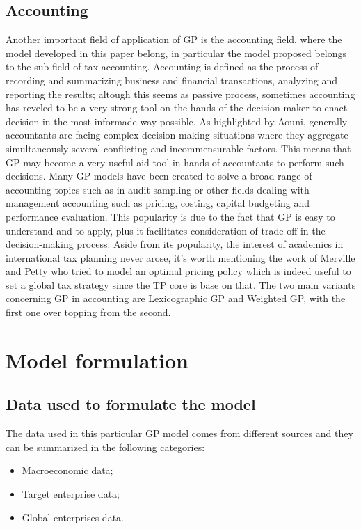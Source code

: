 \documentclass{article}
\begin{document}
\subsection{Accounting}
Another important field of application of GP is the accounting field, where the model developed in this paper belong, in particular the model proposed belongs to the sub field of tax accounting. Accounting is defined as the process of recording and summarizing business and financial transactions, analyzing and reporting the results; altough this seems as passive process, sometimes accounting has reveled to be a very strong tool on the hands of the decision maker to enact decision in the most informade way possible.
As highlighted by Aouni\cite{aouni_goal_2017}, generally accountants are facing complex decision-making situations where they aggregate simultaneously several conflicting and incommensurable factors. This means that GP may become a very useful aid tool in hands of accountants to perform such decisions. Many GP models have been created to solve a broad range of accounting topics such as in audit sampling\cite{tayi_integration_1985} or other fields dealing with management accounting such as pricing\cite{tan_multipleobjective_2008}, costing\cite{dowlatshahi_product_2001}, capital budgeting and performance evaluation\cite{hung_integrated_2011}.
This popularity is due to the fact that GP is easy to understand and to apply, plus it facilitates consideration of trade-off in the decision-making process.
Aside from its popularity, the interest of academics in international tax planning never arose,
it’s worth mentioning the work of Merville and Petty\cite{merville_transfer_1978} who tried to model an optimal pricing policy which is indeed useful to set a global tax
strategy since the TP core is base on that.
The two main variants concerning GP in accounting are Lexicographic GP and Weighted GP, with the first one over topping from the second.

\pagebreak

\section{Model formulation}

\subsection{Data used to formulate the model}
The data used in this particular GP model comes from different sources and they can be summarized in the following categories:
\begin{itemize}
    \item Macroeconomic data;
    \item Target enterprise data;
    \item Global enterprises data.
\end{itemize}
\end{document}
